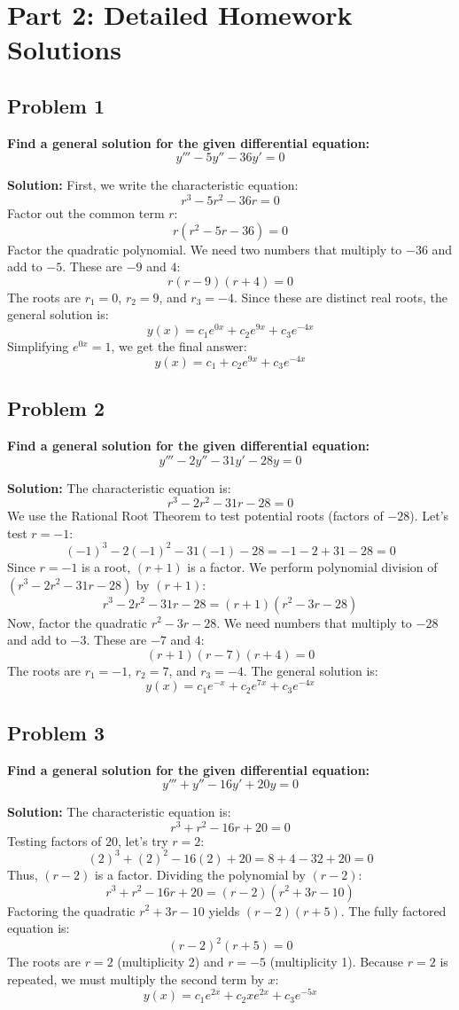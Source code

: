 \documentclass[11pt, a4paper]{article}
\theoremstyle{definition}
\theoremstyle{remark}
\begin{document}
\newpage
\section{Part 2: Detailed Homework Solutions}

\subsection*{Problem 1}
\textbf{Find a general solution for the given differential equation:}
\[ y''' - 5y'' - 36y' = 0 \]

\textbf{Solution:}
First, we write the characteristic equation:
\[ r^3 - 5r^2 - 36r = 0 \]
Factor out the common term $r$:
\[ r(r^2 - 5r - 36) = 0 \]
Factor the quadratic polynomial. We need two numbers that multiply to $-36$ and add to $-5$. These are $-9$ and $4$:
\[ r(r - 9)(r + 4) = 0 \]
The roots are $r_1 = 0$, $r_2 = 9$, and $r_3 = -4$. Since these are distinct real roots, the general solution is:
\[ y(x) = c_1 e^{0x} + c_2 e^{9x} + c_3 e^{-4x} \]
Simplifying $e^{0x} = 1$, we get the final answer:
\[ y(x) = c_1 + c_2 e^{9x} + c_3 e^{-4x} \]

\subsection*{Problem 2}
\textbf{Find a general solution for the given differential equation:}
\[ y''' - 2y'' - 31y' - 28y = 0 \]

\textbf{Solution:}
The characteristic equation is:
\[ r^3 - 2r^2 - 31r - 28 = 0 \]
We use the Rational Root Theorem to test potential roots (factors of $-28$). Let's test $r = -1$:
\[ (-1)^3 - 2(-1)^2 - 31(-1) - 28 = -1 - 2 + 31 - 28 = 0 \]
Since $r = -1$ is a root, $(r + 1)$ is a factor. We perform polynomial division of $(r^3 - 2r^2 - 31r - 28)$ by $(r + 1)$:
\[ r^3 - 2r^2 - 31r - 28 = (r + 1)(r^2 - 3r - 28) \]
Now, factor the quadratic $r^2 - 3r - 28$. We need numbers that multiply to $-28$ and add to $-3$. These are $-7$ and $4$:
\[ (r + 1)(r - 7)(r + 4) = 0 \]
The roots are $r_1 = -1$, $r_2 = 7$, and $r_3 = -4$. The general solution is:
\[ y(x) = c_1 e^{-x} + c_2 e^{7x} + c_3 e^{-4x} \]

\subsection*{Problem 3}
\textbf{Find a general solution for the given differential equation:}
\[ y''' + y'' - 16y' + 20y = 0 \]

\textbf{Solution:}
The characteristic equation is:
\[ r^3 + r^2 - 16r + 20 = 0 \]
Testing factors of $20$, let's try $r = 2$:
\[ (2)^3 + (2)^2 - 16(2) + 20 = 8 + 4 - 32 + 20 = 0 \]
Thus, $(r - 2)$ is a factor. Dividing the polynomial by $(r - 2)$:
\[ r^3 + r^2 - 16r + 20 = (r - 2)(r^2 + 3r - 10) \]
Factoring the quadratic $r^2 + 3r - 10$ yields $(r - 2)(r + 5)$. The fully factored equation is:
\[ (r - 2)^2 (r + 5) = 0 \]
The roots are $r = 2$ (multiplicity 2) and $r = -5$ (multiplicity 1). Because $r=2$ is repeated, we must multiply the second term by $x$:
\[ y(x) = c_1 e^{2x} + c_2 x e^{2x} + c_3 e^{-5x} \]
\end{document}
